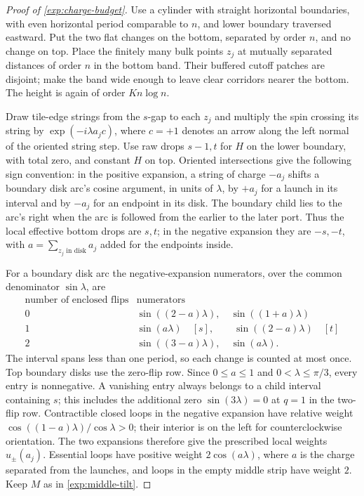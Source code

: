 \begin{proof}[Proof of \eqref{exp:charge-budget}]
Use a cylinder with straight horizontal boundaries, with even horizontal
period comparable to $n$, and lower boundary traversed eastward. Put the
two flat changes on the bottom, separated by order $n$, and no change
on top. Place the finitely many bulk points $z_j$ at mutually separated
distances of order $n$ in the bottom band. Their buffered cutoff patches
are disjoint; make the band wide enough to leave clear corridors nearer
the bottom. The height is again of order $Kn\log n$.

Draw tile-edge strings from the $s$-gap to each $z_j$ and multiply the
spin crossing its string by $\exp(-i\lambda a_j c)$, where $c=+1$
denotes an arrow along the left normal of the oriented string step.
Use raw drops $s-1,t$ for $H$ on the lower boundary, with total zero,
and constant $H$ on top. Oriented intersections give the following
sign convention: in the positive expansion, a string of charge $-a_j$
shifts a boundary disk arc's cosine argument, in units of $\lambda$,
by $+a_j$ for a launch in its interval and by $-a_j$ for an endpoint
in its disk. The boundary child lies to the arc's right when the arc
is followed from the earlier to the later port. Thus the local effective
bottom drops are $s,t$; in the negative expansion they are $-s,-t$,
with $a=\sum_{z_j\text{ in disk}}a_j$ added for the endpoints inside.

For a boundary disk arc the negative-expansion numerators, over the
common denominator $\sin\lambda$, are
\begin{equation}\label{exp:charged-table}
\begin{array}{c|l}
 \text{number of enclosed flips}&\text{numerators}\\ \hline
 0&\sin((2-a)\lambda),\quad\sin((1+a)\lambda)\\
 1&\sin(a\lambda)\quad[s],\qquad
      \sin((2-a)\lambda)\quad[t]\\
 2&\sin((3-a)\lambda),\quad\sin(a\lambda).
\end{array}
\end{equation}
The interval spans less than one period, so each change is counted at
most once. Top boundary disks use the zero-flip row. Since $0\le a\le1$
and $0<\lambda\le\pi/3$, every entry is nonnegative. A vanishing
entry always belongs to a child interval containing $s$; this includes
the additional zero $\sin(3\lambda)=0$ at $q=1$ in the two-flip row.
Contractible closed loops in the negative expansion have relative weight
$\cos((1-a)\lambda)/\cos\lambda>0$; their interior is on the left
for counterclockwise orientation. The two expansions therefore give
the prescribed local weights $u_\pm(a_j)$. Essential loops have
positive weight $2\cos(a\lambda)$, where $a$ is the charge separated
from the launches, and loops in the empty middle strip have weight $2$.
Keep $M$ as in \eqref{exp:middle-tilt}.


\end{proof}
